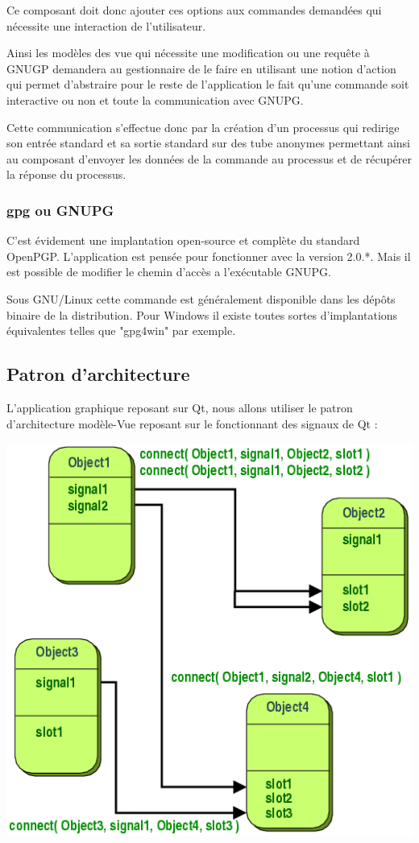\documentclass{../res/univ-projet}
\begin{document}
      Ce composant doit donc ajouter ces options aux commandes demandées qui nécessite une interaction de l'utilisateur.

      Ainsi les modèles des vue qui nécessite une modification ou une requête à GNUGP demandera au gestionnaire de le faire
      en utilisant une notion d'action qui permet d'abstraire pour le reste de l'application le fait qu'une commande soit
      interactive ou non et toute la communication avec GNUPG.

      Cette communication s'effectue donc par la création d'un processus qui redirige son entrée standard et sa sortie standard
      sur des tube anonymes permettant ainsi au composant d'envoyer les données de la commande au processus et de récupérer la
      réponse du processus.


    \subsubsection{gpg ou GNUPG}

      C'est évidement une implantation open-source et complète du standard OpenPGP.
      L'application est pensée pour fonctionner avec la version 2.0.*.
      Mais il est possible de modifier le chemin d’accès a l’exécutable GNUPG.

      Sous GNU/Linux cette commande est généralement disponible dans les dépôts binaire de la distribution.
      Pour Windows il existe toutes sortes d'implantations équivalentes telles que "gpg4win" par exemple.


  \newpage
  \subsection{Patron d'architecture}

    L'application graphique reposant sur Qt, nous allons utiliser le patron d'architecture modèle-Vue
    reposant sur le fonctionnant des signaux de Qt :
    \begin{center}
    \includegraphics[scale=.5]{../res/MV.png}
    \end{center}
\end{document}
